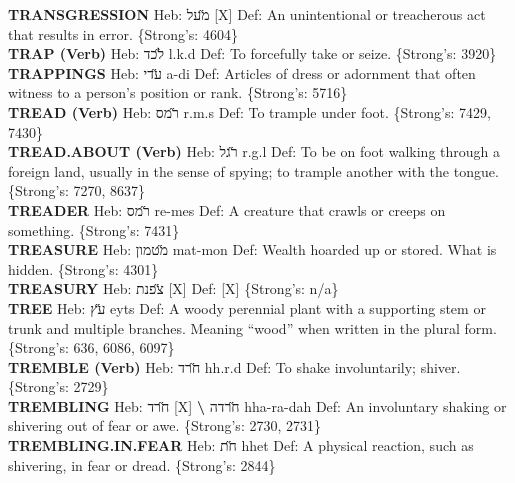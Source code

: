 {\textbf{TRANSGRESSION} Heb: {\large\H מעל} {[}X{]} Def: An unintentional or treacherous act that results in error. \{Strong's: 4604\}\hfill{}\\

\textbf{TRAP (Verb)} Heb: {\large\H לכד} l.k.d Def: To forcefully take or seize. \{Strong's: 3920\}\hfill{}\\

\textbf{TRAPPINGS} Heb: {\large\H עדי} a-di Def: Articles of dress or adornment that often witness to a person's position or rank. \{Strong's: 5716\}\hfill{}\\

\textbf{TREAD (Verb)} Heb: {\large\H רמס} r.m.s Def: To trample under foot. \{Strong's: 7429, 7430\}\hfill{}\\

\textbf{TREAD.ABOUT (Verb)} Heb: {\large\H רגל} r.g.l Def: To be on foot walking through a foreign land, usually in the sense of spying; to trample another with the tongue. \{Strong's: 7270, 8637\}\hfill{}\\

\textbf{TREADER} Heb: {\large\H רמס} re-mes Def: A creature that crawls or creeps on something. \{Strong's: 7431\}\hfill{}\\

\textbf{TREASURE} Heb: {\large\H מטמון} mat-mon Def: Wealth hoarded up or stored. What is hidden. \{Strong's: 4301\}\hfill{}\\

\textbf{TREASURY} Heb: {\large\H צפנת} {[}X{]} Def: {[}X{]} \{Strong's: n/a\}\hfill{}\\

\textbf{TREE} Heb: {\large\H עץ} eyts Def: A woody perennial plant with a supporting stem or trunk and multiple branches. Meaning ``wood'' when written in the plural form. \{Strong's: 636, 6086, 6097\}\hfill{}\\

\textbf{TREMBLE (Verb)} Heb: {\large\H חרד} hh.r.d Def: To shake involuntarily; shiver. \{Strong's: 2729\}\hfill{}\\

\textbf{TREMBLING} Heb: {\large\H חרד} {[}X{]} \textbf{\textbackslash{}} {\large\H חרדה} hha-ra-dah Def: An involuntary shaking or shivering out of fear or awe. \{Strong's: 2730, 2731\}\hfill{}\\

\textbf{TREMBLING.IN.FEAR} Heb: {\large\H חת} hhet Def: A physical reaction, such as shivering, in fear or dread. \{Strong's: 2844\}\hfill{}\\

}
